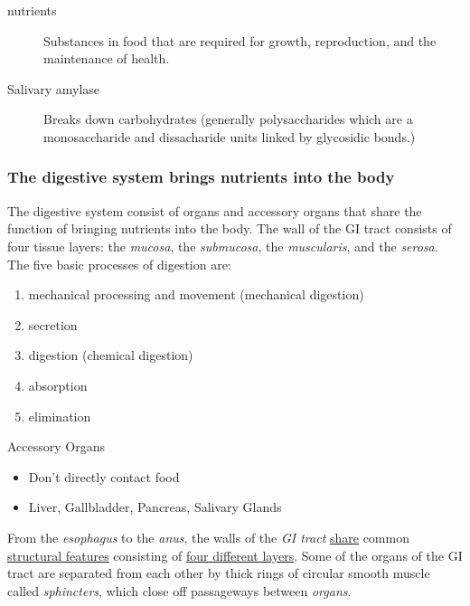 \documentclass[11pt]{article}
\begin{document}
\begin{description}
\item[{nutrients}] Substances in food that are required for growth, reproduction,
and the maintenance of health.
\item[{Salivary amylase}] Breaks down carbohydrates (generally polysaccharides which
are a monosaccharide and dissacharide units linked by glycosidic bonds.)
\end{description}

\subsubsection{The digestive system brings nutrients into the body}
\label{sec:orgf645f37}

The digestive system consist of organs and accessory organs that share the
function of bringing nutrients into the body. The wall of the GI tract consists
of four tissue layers: the \emph{mucosa}, the \emph{submucosa}, the \emph{muscularis}, and the
\emph{serosa}. The five basic processes of digestion are:
\begin{enumerate}
\item mechanical processing and movement (mechanical digestion)
\item secretion
\item digestion (chemical digestion)
\item absorption
\item elimination
\end{enumerate}


Accessory Organs
\begin{itemize}
\item Don't directly contact food
\item Liver, Gallbladder, Pancreas, Salivary Glands
\end{itemize}

From the \emph{esophagus} to the \emph{anus}, the walls of the \emph{GI tract} \uline{share} common
\uline{structural features} consisting of \uline{four different layers}. Some of the organs of
the GI tract are separated from each other by thick rings of circular smooth
muscle called \emph{sphincters}, which close off passageways between \emph{organs}.
\end{document}
